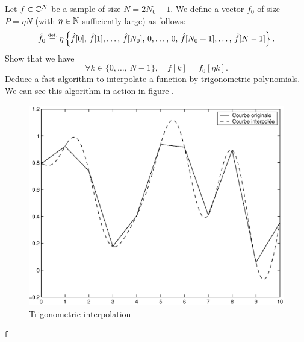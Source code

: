  
\begin{exo}
\label{exo-interpolation-trigonometric}
  Let $ f \in \mathbb{C}^N $ be a sample of size $ N = 2N_0 + 1 $. We define a vector $ f_0 $ of size $ P = \eta N $ (with $ \eta \in \mathbb{N} $ sufficiently large) as follows:
\begin{equation*}
\hat{f_0} \stackrel{\mbox{\upshape\tiny def.}}{=} \eta \left\{\hat{f}[0], \, \hat{f}[1], \ldots, \, \hat{f}[N_0], \, 0 , \ldots, \, 0, \, \hat{f}[N_0 + 1], \ldots, \, \hat{f}[N-1] \right\}.
\end{equation*}
Show that we have
\begin{equation*}
\forall k \in \{0, \ldots, \, N-1\}, \quad f[k] = f_0 [\eta k].
\end{equation*}
Deduce a fast algorithm to interpolate a function by trigonometric polynomials. We can see this algorithm in action in figure . \begin{figure}[ht]
    \begin{center}
    \includegraphics [scale = 0.4]{images/fft-interpolation.eps}
    \end{center}
    \caption{Trigonometric interpolation}
              \label{fig-fft-interpolation}
\end{figure}f
\end{exo}
 
